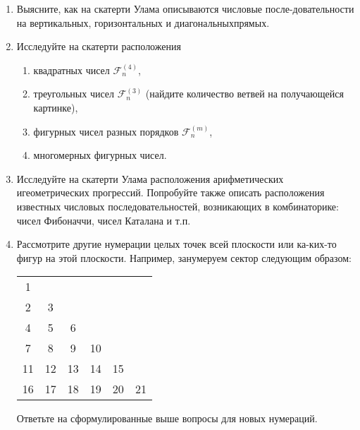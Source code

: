 \begin{enumerate}
\item Выясните, как на скатерти Улама описываются числовые после-\linebreak довательности на вертикальных, горизонтальных и диагональных\linebreak прямых.
\item Исследуйте на скатерти расположения
\begin{enumerate}
\item квадратных чисел $\mathcal{F}_n^{(4)}$,
\item треугольных чисел $\mathcal{F}_n^{(3)}$ (найдите количество ветвей на получающейся картинке),
\item фигурных чисел разных порядков $\mathcal{F}_n^{(m)}$,
\item многомерных фигурных чисел.
\end{enumerate}
\item Исследуйте на скатерти Улама расположения арифметических и\linebreak геометрических прогрессий. Попробуйте также описать расположения известных числовых последовательностей, возникающих в комбинаторике: чисел Фибоначчи, чисел Каталана и т.п.
\item Рассмотрите другие нумерации целых точек всей плоскости или ка-\linebreak ких-то фигур на этой плоскости. Например, занумеруем сектор следующим образом:

\begin{center}
\begin{tabular}{ c c c c c c }
1 &  &  &  &   & \\
2 & 3 &  &  &  &  \\
4 & 5 & 6 &  & & \\
7 & 8  & 9 & 10& &  \\
11& 12 & 13& 14& 15 & \\
16& 17 & 18& 19& 20 & 21  
\end{tabular}
\end{center}
Ответьте на сформулированные выше вопросы для новых нумераций.
\end{enumerate}